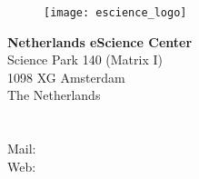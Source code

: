 

\setlength{\parindent}{0pt}
\setlength{\parskip}{1em}


\begin{center}
\begin{figure}[htbp]
\centerline{\texttt{[image: escience\_logo]}}
\end{figure}
\end{center}
 
\vspace{10cm} 

\textbf{Netherlands eScience Center} \\
Science Park 140 (Matrix I)\\
1098 XG Amsterdam\\
The Netherlands \\
\\
 \\
Mail:  \\
Web:  \\
